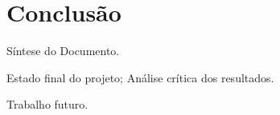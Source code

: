 \chapter*{Conclusão}
\label{concl}

Síntese do Documento.

Estado final do projeto; Análise crítica dos resultados.

Trabalho futuro.

